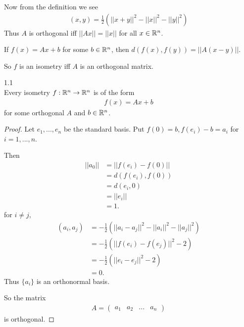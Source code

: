 \documentclass[a4paper]{article}
\begin{document}
Now from the definition we see
\begin{equation*}
\begin{aligned}
(x,y) = \frac{1}{2} (||x+y||^2 - ||x||^2 - ||y||^2)
\end{aligned}
\end{equation*}
Thus $A$ is orthogonal iff $||Ax|| = ||x||$ for all $x \in \mathbb{R}^n$.

If $f(x) = Ax+b$ for some $b \in \mathbb{R}^n$, then $d(f(x),f(y)) = ||A(x-y)||$.

So $f$ is an isometry iff $A$ is an orthogonal matrix.

\begin{thm} 1.1 \label{th1.1}\\
Every isometry $f:\mathbb{R}^n \to \mathbb{R}^n$ is of the form
\begin{equation*}
\begin{aligned}
f(x) = Ax+b
\end{aligned}
\end{equation*}
for some orthogonal $A$ and $b \in \mathbb{R}^n$.
\begin{proof}
Let $e_1,...,e_n$ be the standard basis. Put $f(0) = b, f(e_i)-b=a_i$ for $i=1,...,n$.

Then 
\begin{equation*}
\begin{aligned}
||a_0|| &= ||f(e_i)-f(0)||\\
&=d(f(e_i),f(0))\\
&=d(e_i,0)\\
&=||e_i||\\
&= 1.
\end{aligned}
\end{equation*}
for $i \neq j$,
\begin{equation*}
\begin{aligned}
(a_i,a_j)&=-\frac{1}{2}(||a_i-a_j||^2 - ||a_i||^2 - ||a_j||^2)\\
&=-\frac{1}{2}(||f(e_i)-f(e_j)||^2-2)\\
&=-\frac{1}{2}(||e_i-e_j||^2-2)\\
&=0.
\end{aligned}
\end{equation*}
Thus $\{a_i\}$ is an orthonormal basis.

So the matrix
\begin{equation*}
\begin{aligned}
A=
(\begin{matrix}
a_1 & a_2 & ... & a_n
\end{matrix})
\end{aligned}
\end{equation*}
is orthogonal.


\end{proof}
\end{thm}
\end{document}
